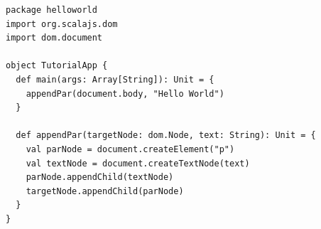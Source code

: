 \begin{minipage}{\linewidth}
\begin{lstlisting}[label={lst:helloscalajs},
frame=single, numbers=none,captionpos=b, 
caption={Przykładowy projekt w Scali.js wypisujący napis Hello World na stronie.}]
package helloworld
import org.scalajs.dom
import dom.document

object TutorialApp {
  def main(args: Array[String]): Unit = {
    appendPar(document.body, "Hello World")
  }

  def appendPar(targetNode: dom.Node, text: String): Unit = {
    val parNode = document.createElement("p")
    val textNode = document.createTextNode(text)
    parNode.appendChild(textNode)
    targetNode.appendChild(parNode)
  }
}
\end{lstlisting}
\end{minipage}
